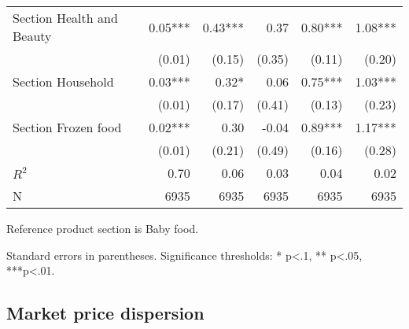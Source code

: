 \documentclass[english]{article}
\begin{document}
\begin{table}
\begin{threeparttable}
\begin{tabular}{lrrrrr}
Section Health and Beauty                & 0.05***  & 0.43***  & 0.37     & 0.80***  & 1.08***   \\
                                         & (0.01)   & (0.15)   & (0.35)   & (0.11)   & (0.20)    \\
Section Household                        & 0.03***  & 0.32*    & 0.06     & 0.75***  & 1.03***   \\
                                         & (0.01)   & (0.17)   & (0.41)   & (0.13)   & (0.23)    \\
Section Frozen food                      & 0.02***  & 0.30     & -0.04    & 0.89***  & 1.17***   \\
                                         & (0.01)   & (0.21)   & (0.49)   & (0.16)   & (0.28)    \\
\midrule
$R^2$                                       & 0.70     & 0.06     & 0.03     & 0.04     & 0.02      \\
N                                        & 6935     & 6935     & 6935     & 6935     & 6935      \\
\bottomrule
\bottomrule
\end{tabular}
\begin{tablenotes}
      \small
      \item Reference product section is Baby food.
	  \item Standard errors in parentheses. Significance thresholds: * p<.1, ** p<.05, ***p<.01.
\end{tablenotes}
\end{threeparttable}
\end{table}

\subsection{Market price dispersion}
\end{document}
